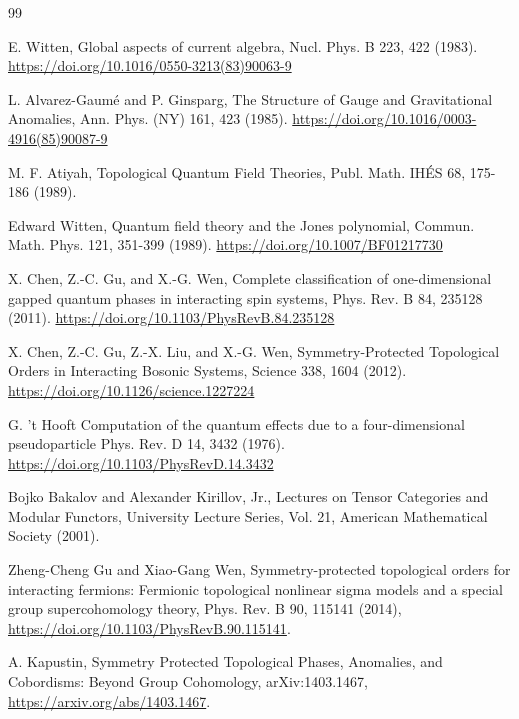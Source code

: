 \documentclass[12pt,a4paper]{article}
\begin{document}
\begin{thebibliography}{99}
		
	E. Witten,  
	Global aspects of current algebra,  
	Nucl. Phys. B 223, 422 (1983).  
	\url{https://doi.org/10.1016/0550-3213(83)90063-9}  
	
	
	L. Alvarez-Gaumé and P. Ginsparg,  
	The Structure of Gauge and Gravitational Anomalies,  
	Ann. Phys. (NY) 161, 423 (1985).  
	\url{https://doi.org/10.1016/0003-4916(85)90087-9}  
	
	
	
	M. F. Atiyah,  
	Topological Quantum Field Theories,  
	Publ. Math. IHÉS 68, 175-186 (1989).  
	
	
	Edward Witten, 
	Quantum field theory and the Jones polynomial, 
	Commun. Math. Phys. 121, 351-399 (1989).
	\url{https://doi.org/10.1007/BF01217730}	
	
	
	X. Chen, Z.-C. Gu, and X.-G. Wen,  
	Complete classification of one-dimensional gapped quantum phases in interacting spin systems,  
	Phys. Rev. B 84, 235128 (2011).  
	\url{https://doi.org/10.1103/PhysRevB.84.235128} 
	
	
	X. Chen, Z.-C. Gu, Z.-X. Liu, and X.-G. Wen,  
	Symmetry-Protected Topological Orders in Interacting Bosonic Systems,  
	Science 338, 1604 (2012).  
	\url{https://doi.org/10.1126/science.1227224}  
	
	
	G. 't Hooft
	Computation of the quantum effects due to a four-dimensional pseudoparticle
	Phys. Rev. D 14, 3432 (1976).
	\url{https://doi.org/10.1103/PhysRevD.14.3432}
	
	
	Bojko Bakalov and Alexander Kirillov, Jr.,
	Lectures on Tensor Categories and Modular Functors,
	University Lecture Series, Vol. 21, American Mathematical Society (2001).
	
	
	Zheng-Cheng Gu and Xiao-Gang Wen,
	Symmetry-protected topological orders for interacting fermions: Fermionic topological nonlinear sigma models and a special group supercohomology theory,
	Phys. Rev. B 90, 115141 (2014),
	\url{https://doi.org/10.1103/PhysRevB.90.115141}.
	
	
	A. Kapustin,
	Symmetry Protected Topological Phases, Anomalies, and Cobordisms: Beyond Group Cohomology,
	arXiv:1403.1467,
	\url{https://arxiv.org/abs/1403.1467}.
	

\end{thebibliography}
\end{document}
